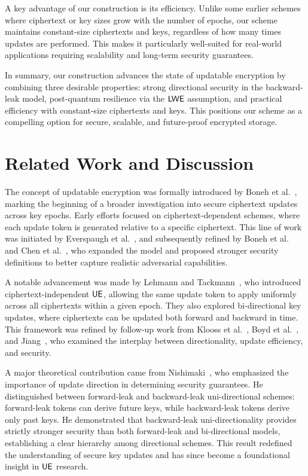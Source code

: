 \documentclass{fundam}
\begin{document}
A key advantage of our construction is its efficiency. Unlike some earlier schemes where ciphertext or key sizes grow with the number of epochs, our scheme maintains constant-size ciphertexts and keys, regardless of how many times updates are performed. This makes it particularly well-suited for real-world applications requiring scalability and long-term security guarantees.

In summary, our construction advances the state of updatable encryption by combining three desirable properties: strong directional security in the backward-leak model, post-quantum resilience via the $\mathsf{LWE}$ assumption, and practical efficiency with constant-size ciphertexts and keys. This positions our scheme as a compelling option for secure, scalable, and future-proof encrypted storage.




\section{Related Work and Discussion}

The concept of updatable encryption was formally introduced by Boneh et al.~\cite{boneh2013key}, marking the beginning of a broader investigation into secure ciphertext updates across key epochs. Early efforts focused on ciphertext-dependent schemes, where each update token is generated relative to a specific ciphertext. This line of work was initiated by Everspaugh et al.~\cite{EPRS17}, and subsequently refined by Boneh et al.~\cite{BEKS20} and Chen et al.~\cite{CLT20}, who expanded the model and proposed stronger security definitions to better capture realistic adversarial capabilities.

A notable advancement was made by Lehmann and Tackmann~\cite{LT18}, who introduced ciphertext-independent $\mathsf{UE}$, allowing the same update token to apply uniformly across all ciphertexts within a given epoch. They also explored bi-directional key updates, where ciphertexts can be updated both forward and backward in time. This framework was refined by follow-up work from Klooss et al.~\cite{klooss2019r}, Boyd et al.~\cite{BDGJ20}, and Jiang~\cite{jiang2020}, who examined the interplay between directionality, update efficiency, and security.

A major theoretical contribution came from Nishimaki~\cite{nishimaki2022direction}, who emphasized the importance of update direction in determining security guarantees. He distinguished between forward-leak and backward-leak uni-directional schemes: forward-leak tokens can derive future keys, while backward-leak tokens derive only past keys. He demonstrated that backward-leak uni-directionality provides strictly stronger security than both forward-leak and bi-directional models, establishing a clear hierarchy among directional schemes. This result redefined the understanding of secure key updates and has since become a foundational insight in $\mathsf{UE}$ research.
\end{document}

